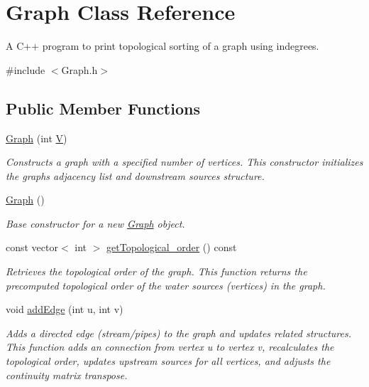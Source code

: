 \hypertarget{classGraph}{}\section{Graph Class Reference}
\label{classGraph}


A C++ program to print topological sorting of a graph using indegrees.  




{\ttfamily \#include $<$Graph.\+h$>$}

\subsection*{Public Member Functions}
\begin{DoxyCompactItemize}
\item 
\mbox{\hyperlink{classGraph_af3ff6b295df8bf3bee0bafd7c7d56915}{Graph}} (int \mbox{\hyperlink{classGraph_a2b722f7cfa7a21e4cb5fae488b3d4dcc}{V}})
\begin{DoxyCompactList}\small\item\em Constructs a graph with a specified number of vertices. This constructor initializes the graph\textquotesingle{}s adjacency list and downstream sources structure. \end{DoxyCompactList}\item 
\mbox{\hyperlink{classGraph_ae4c72b8ac4d693c49800a4c7e273654f}{Graph}} ()
\begin{DoxyCompactList}\small\item\em Base constructor for a new \mbox{\hyperlink{classGraph}{Graph}} object. \end{DoxyCompactList}\item 
const vector$<$ int $>$ \mbox{\hyperlink{classGraph_a838b34813d6d5ddcfc9e452b357d98bd}{get\+Topological\+\_\+order}} () const
\begin{DoxyCompactList}\small\item\em Retrieves the topological order of the graph. This function returns the precomputed topological order of the water sources (vertices) in the graph. \end{DoxyCompactList}\item 
void \mbox{\hyperlink{classGraph_ad8c10df34357b2cd865c81e0c4f0bd8c}{add\+Edge}} (int u, int v)
\begin{DoxyCompactList}\small\item\em Adds a directed edge (stream/pipes) to the graph and updates related structures. This function adds an connection from vertex {\ttfamily u} to vertex {\ttfamily v}, recalculates the topological order, updates upstream sources for all vertices, and adjusts the continuity matrix transpose. \end{DoxyCompactList}\item 

\end{DoxyCompactItemize}
